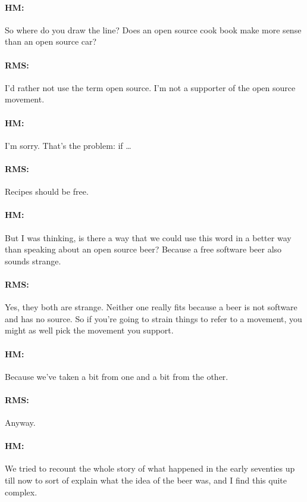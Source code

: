 \paragraph{HM:}{So where do you draw the line? Does an open source cook book
make more sense than an open source car?}

\paragraph{RMS:}{I'd rather not use the term open source. I'm not a supporter of
the open source movement.}

\paragraph{HM:}{I'm sorry. That's the problem: if \dots}

\paragraph{RMS:}{Recipes should be free.}

\paragraph{HM:}{But I was thinking, is there a way that we could use this word
in a better way than speaking about an open source beer? Because a free software
beer also sounds strange.}

\paragraph{RMS:}{Yes, they both are strange. Neither one really f\hbox{}its
because a beer is not software and has no source. So if you're going to strain
things to refer to a movement, you might as well pick the movement you support.}

\paragraph{HM:}{Because we've taken a bit from one and a bit from the other.}

\paragraph{RMS:}{Anyway.}

\paragraph{HM:}{We tried to recount the whole story of what happened in the
early seventies up till now to sort of explain what the idea of the beer was,
and I f\hbox{}ind this quite complex.}

